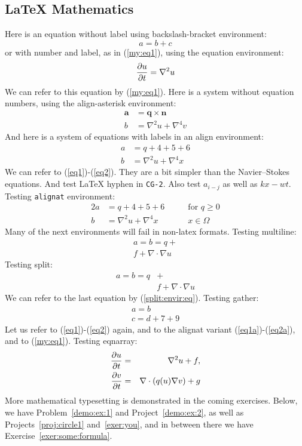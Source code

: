 \documentclass[%
oneside,                 %
final,                   %
10pt]{article}
\theoremstyle{definition}
\begin{document}
\begin{enumerate}
\section{{\LaTeX} Mathematics}
Here is an equation without label using backslash-bracket environment:
\[ a = b + c \]
or with number and label, as in (\ref{my:eq1}), using the equation environment:
\begin{equation}
{\partial u\over\partial t} = \nabla^2 u \label{my:eq1}
\end{equation}
We can refer to this equation by (\ref{my:eq1}).
Here is a system without equation numbers, using the align-asterisk environment:
\begin{align*}
\pmb{a} &= \pmb{q}\times\pmb{n} \\ 
b &= \nabla^2 u + \nabla^4 v
\end{align*}
And here is a system of equations with labels in an align environment:
\begin{align}
a &= q + 4 + 5+ 6 \label{eq1} \\ 
b &= \nabla^2 u + \nabla^4 x \label{eq2}
\end{align}
We can refer to (\ref{eq1})-(\ref{eq2}). They are a bit simpler than
the Navier--Stokes equations. And test {\LaTeX} hyphen in \texttt{CG-2}.
Also test $a_{i-j}$ as well as $kx-wt$.
Testing \texttt{alignat} environment:
\begin{alignat}{2}
a &= q + 4 + 5+ 6\qquad & \mbox{for } q\geq 0 \label{eq1a} \\ 
b &= \nabla^2 u + \nabla^4 x & x\in\Omega \label{eq2a}
\end{alignat}
Many of the next environments will fail in non-latex formats.
Testing multiline:
\begin{multline}
a = b = q + \\ 
  f + \nabla\cdot\nabla u
\label{multiline:eq1}
\end{multline}
Testing split:
\begin{equation}
\label{split:envir:eq}
\begin{split}
a = b = q &+ \\ 
  & f + \nabla\cdot\nabla u
\end{split}
\end{equation}
We can refer to the last equation by (\ref{split:envir:eq}).
Testing gather:
\begin{gather}
a = b \\ 
c = d + 7 + 9
\end{gather}
Let us refer to (\ref{eq1})-(\ref{eq2}) again, and to the
alignat variant (\ref{eq1a})-(\ref{eq2a}), and to (\ref{my:eq1}).
Testing eqnarray:
\begin{eqnarray}
{\partial u\over\partial t} &=& \nabla^2 u + f, \label{myeq1}\\ 
{\partial v\over\partial t} &=& \nabla\cdot(q(u)\nabla v) + g \label{myeq2}
\end{eqnarray}
More mathematical typesetting is demonstrated in the coming exercises.
Below, we have Problem~\vref{demo:ex:1} and Project~\vref{demo:ex:2},
as well as Projects~\vref{proj:circle1} and~\vref{exer:you}, and in
between there we have Exercise~\vref{exer:some:formula}.

\end{enumerate}
\end{document}
